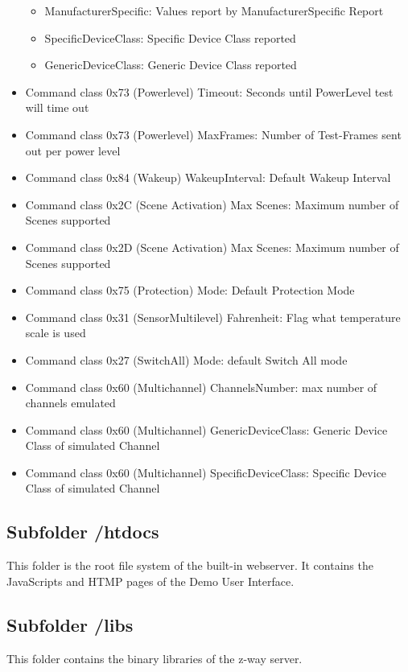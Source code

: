 \begin{itemize}
\begin{itemize}
\item ManufacturerSpecific: Values report by ManufacturerSpecific Report 
\item SpecificDeviceClass: Specific Device Class reported
\item GenericDeviceClass: Generic Device Class reported
\end{itemize} 
\item Command class 0x73 (Powerlevel) Timeout: Seconds until PowerLevel test will time out
\item Command class 0x73 (Powerlevel) MaxFrames: Number of Test-Frames sent out per power level 
\item Command class 0x84 (Wakeup) WakeupInterval: Default Wakeup Interval
\item Command class 0x2C (Scene Activation) Max Scenes: Maximum number of Scenes supported
\item Command class 0x2D (Scene Activation) Max Scenes: Maximum number of Scenes supported
\item Command class 0x75 (Protection) Mode: Default Protection Mode
\item Command class 0x31 (SensorMultilevel) Fahrenheit: Flag what temperature scale is used
\item Command class 0x27 (SwitchAll) Mode: default Switch All mode
\item Command class 0x60 (Multichannel) ChannelsNumber: max number of channels emulated
\item Command class 0x60 (Multichannel) GenericDeviceClass: Generic Device Class of simulated Channel
\item Command class 0x60 (Multichannel) SpecificDeviceClass: Specific Device Class of simulated Channel
\end{itemize} 


\subsection{Subfolder /htdocs}

This folder is the root file system of the built-in webserver. It contains the JavaScripts and HTMP pages of 
the Demo User Interface.

\subsection{Subfolder  /libs}

This folder contains the binary libraries of the z-way server.

